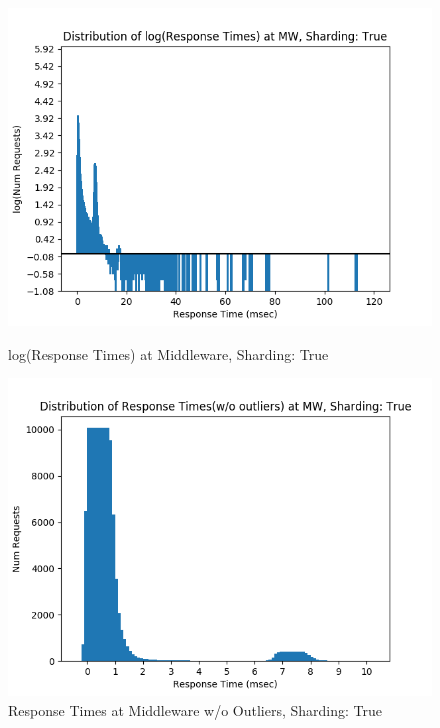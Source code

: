 \documentclass[11pt,a4paper]{article}
\begin{document}
\begin{figure}[H]
	\captionsetup{font=scriptsize,labelfont=scriptsize,justification=centering}
	\centering
	\begin{minipage}{0.5\textwidth}
		\centering
		\includegraphics[scale=0.525]{images/5_mw_log_hist_shard_True.png}
		\caption{log(Response Times) at Middleware, Sharding: True}
	\end{minipage}\hfill
	\begin{minipage}{0.5\textwidth}
		\centering
		\includegraphics[scale=0.525]{images/5_mw_hist_no-outlier_shard_True.png}
		\caption{Response Times at Middleware w/o Outliers, Sharding: True}
	\end{minipage}
\end{figure}
\end{document}
